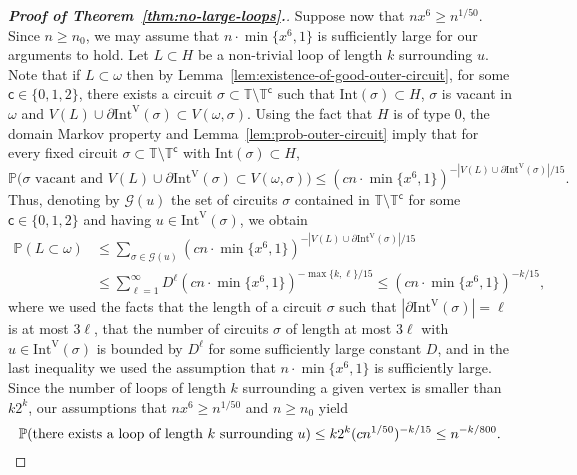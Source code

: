 \documentclass[12pt,reqno]{article}
\def\T{\mathbb{T}}
\renewcommand{\Pr}{\mathbb{P}}
\newcommand{\Int}[1]{\mathrm{Int}(#1)}
\newcommand{\IntVert}[1]{\mathrm{Int}^\mathrm{V}(#1)}
\newcommand{\clr}{{{\mathsf{c}}}}
\begin{document}
\begin{proof}[{\bf Proof of Theorem~\ref{thm:no-large-loops}.}]
Suppose now that $nx^6 \ge n^{1/50}$. Since $n \ge n_0$, we may assume that $n \cdot \min\{x^6,1\}$ is sufficiently large for our arguments to hold.
Let $L \subset H$ be a non-trivial loop of length $k$ surrounding $u$. Note that if $L \subset \omega$ then by Lemma~\ref{lem:existence-of-good-outer-circuit}, for some $\clr\in\{0,1,2\}$, there exists a circuit $\sigma \subset \T\setminus\T^{\clr}$ such that $\Int\sigma \subset H$, $\sigma$ is vacant in $\omega$ and $V(L) \cup \partial \IntVert\sigma \subset V(\omega,\sigma)$.
Using the fact that $H$ is of type 0, the domain Markov property and Lemma~\ref{lem:prob-outer-circuit} imply that for every fixed circuit $\sigma \subset \T\setminus\T^{\clr}$ with $\Int\sigma \subset H$,
\[
\Pr\big(\sigma\text{ vacant and }V(L)\cup\partial\IntVert\sigma \subset V(\omega,\sigma)\big) \le (c n \cdot \min\{x^6,1\})^{-|V(L)\cup \partial\IntVert\sigma|/15}.
\]
Thus, denoting by $\mathcal{G}(u)$ the set of circuits $\sigma$ contained in $\T\setminus\T^{\clr}$ for some $\clr\in\{0,1,2\}$ and having $u\in\IntVert\sigma$, we obtain
\[
\begin{split}
  \Pr(L \subset \omega)
  & \le \sum_{\sigma \in \mathcal{G}(u)} (c n \cdot \min\{x^6,1\})^{-|V(L)\cup\partial\IntVert\sigma|/15}\\
  & \le \sum_{\ell = 1}^{\infty} D^{\ell} (cn \cdot \min\{x^6,1\})^{-\max\{k,\ell\}/15} \le (c n \cdot \min\{x^6,1\})^{-k/15} ,
\end{split}
\]
where we used the facts that the length of a circuit $\sigma$ such that $|\partial \IntVert\sigma|=\ell$ is at most $3\ell$, that the number of circuits $\sigma$ of length at most $3\ell$ with $u \in \IntVert{\sigma}$ is bounded by $D^\ell$ for some sufficiently large constant $D$, and in the last inequality we used the assumption that $n \cdot \min\{x^6,1\}$ is sufficiently large.
Since the number of loops of length $k$ surrounding a given vertex is smaller than $k 2^k$, our assumptions that $nx^6 \ge n^{1/50}$ and $n \ge n_0$ yield
\[
  \Pr(\text{there exists a loop of length $k$ surrounding $u$})
   \le k 2^k (c n^{1/50})^{-k/15} \le n^{-k/800}. \qedhere
\]
\end{proof}



%
%
\end{document}
